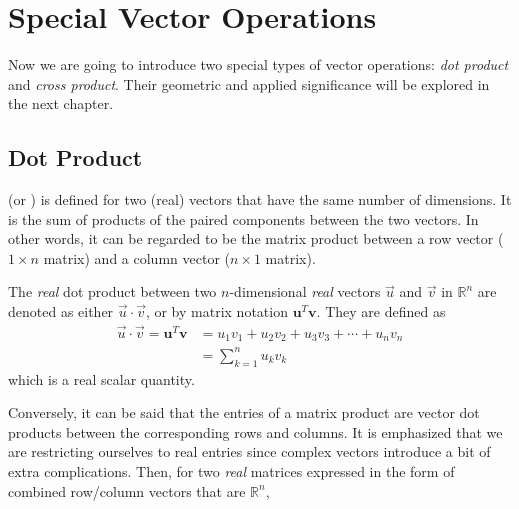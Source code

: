 \section{Special Vector Operations}
\label{section:vectorops}
Now we are going to introduce two special types of vector operations: \textit{dot product} and \textit{cross product}. Their geometric and applied significance will be explored in the next chapter.

\subsection{Dot Product}
\label{section:dotprod}
 (or ) is defined for two (real) vectors that have the same number of dimensions. It is the sum of products of the paired components between the two vectors. In other words, it can be regarded to be the matrix product between a row vector ($1 \times n$ matrix) and a column vector ($n \times 1$ matrix). 
\begin{defn}
\label{defn:dotreal}
The \textit{real} dot product between two $n$-dimensional \textit{real} vectors $\vec{u}$ and $\vec{v}$ in $\mathbb{R}^n$ are denoted as either $\vec{u} \cdot \vec{v}$, or by matrix notation $\textbf{u}^T\textbf{v}$. They are defined as
\begin{subequations}
\label{eqn:dotreal}
\begin{align}
\vec{u} \cdot \vec{v} = \textbf{u}^T\textbf{v} &= u_1v_1 + u_2v_2 + u_3v_3 + \cdots + u_nv_n \\
&= \sum_{k=1}^{n} u_kv_k 
\end{align}    
\end{subequations}
which is a real scalar quantity.
\end{defn}
Conversely, it can be said that the entries of a matrix product are vector dot products between the corresponding rows and columns. It is emphasized that we are restricting ourselves to real entries since complex vectors introduce a bit of extra complications. Then, for two \textit{real} matrices expressed in the form of combined row/column vectors that are $\mathbb{R}^n$,
